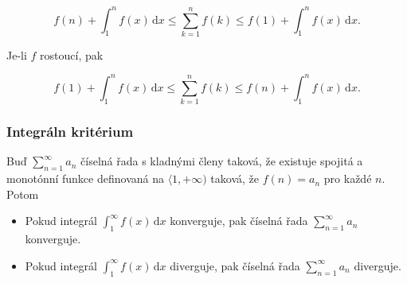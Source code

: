 \documentclass{szzclass}
\begin{document}
\begin{equation*}
f(n) + \int_1^n f(x) \,\mathrm{d} x \leq \sum_{k=1}^n f(k) \leq f(1) + \int_1^n f(x) \,\mathrm{d}x.\end{equation*}

Je-li $f$ rostoucí, pak

\begin{equation*}
f(1) + \int_1^n f(x) \,\mathrm{d} x \leq \sum_{k=1}^n f(k) \leq f(n) + \int_1^n f(x) \,\mathrm{d}x.\end{equation*}

\subsubsection{Integráln kritérium}

Buď $\displaystyle\sum_{n=1}^\infty a_n$ číselná řada s kladnými členy taková,
že existuje spojitá a monotónní funkce definovaná na $\langle 1,+\infty)$ taková,
že $f(n)=a_n$ pro každé $n$. Potom
\begin{itemize}
    \item Pokud integrál $\displaystyle\int_1^\infty f(x)\,\mathrm{d}x$ konverguje,
    pak číselná řada $\displaystyle\sum_{n=1}^\infty a_n$ konverguje.
    \item Pokud integrál $\displaystyle\int_1^\infty f(x)\,\mathrm{d}x$ diverguje,
    pak číselná řada $\displaystyle\sum_{n=1}^\infty a_n$ diverguje.
\end{itemize}
\end{document}
